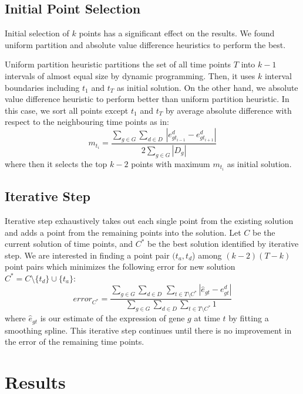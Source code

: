 \documentclass[10pt]{article}
\begin{document}
\subsection{Initial Point Selection}\label{sec:init}

Initial selection of $k$ points has a significant effect on the results. We found
uniform partition and absolute value difference heuristics to perform
the best.

Uniform partition heuristic partitions the set of all time points $T$
into $k-1$ intervals of almost equal size by dynamic programming. Then, it uses $k$ interval
boundaries including $t_{1}$ and $t_{T}$ as initial solution. On the other hand, we absolute value
difference heuristic to perform better than uniform partition
heuristic. In this case, we sort all points except $t_{1}$ and $t_{T}$ by average absolute
difference with respect to the neighbouring time points as in:
%
\begin{equation}
m_{t_{i}} = \frac{\sum_{g \in G} \sum_{d \in D}\,|e_{g t_{i-1}}^{d} - e_{g t_{i+1}}^{d}|}{2 \sum_{g \in G} |D_{g}|}
\end{equation}
%
where then it selects the top $k-2$ points with maximum $m_{t_{i}}$ as
initial solution. 

\subsection{Iterative Step}\label{sec:iterative}

Iterative step exhaustively takes out each single
point from the existing solution and adds a point from the remaining
points into the solution. Let $C$ be the current solution of time points, and $C^{*}$ be the best solution
identified by iterative step. We are interested in finding a point
pair $(t_{a}, t_{d}$) among $(k-2)(T-k)$ point pairs which minimizes the following error for new
solution $C^{*} = C \setminus \{t_{d}\} \cup \{t_{a}\}$:
%
\begin{equation}
\textit{error}_{C^{*}} = \frac{\sum_{g \in G} \sum_{d \in D}\, \sum_{t \in
    T \setminus C^{*}}|\hat{e}_{gt} - e_{gt}^{d}|}{\sum_{g \in G}
  \sum_{d \in D} \sum_{t \in
    T \setminus C^{*}} 1}
\end{equation}
%
where $\hat{e}_{gt}$ is our estimate of the expression of gene $g$ at
time $t$ by fitting a smoothing spline. This iterative step continues until there is
no improvement in the error of the remaining time points. 

\section{Results}

 

\end{document}

